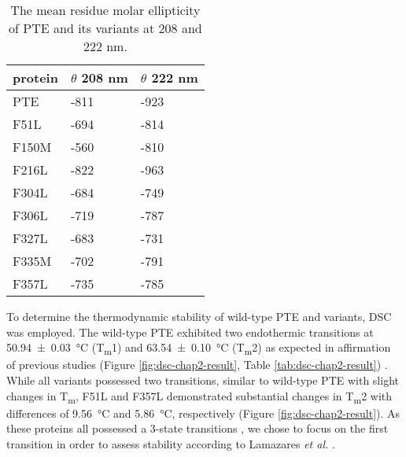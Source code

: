 \begin{refsection}
\begin{table}[htbp]
    \centering
    \begin{tabular}{lll}
    \hline

    protein & $\theta$ 208 nm & $\theta$ 222 nm\\
    \hline

    PTE & -811  & -923 \\
    F51L & -694 &  -814 \\
    F150M & -560 & -810 \\
    F216L & -822 & -963 \\
    F304L & -684 & -749 \\
    F306L & -719 & -787 \\
    F327L & -683 & -731 \\
    F335M & -702 & -791 \\
    F357L & -735 & -785 \\

    \hline      
    \end{tabular}
    \caption[The mean residue molar ellipticity of PTE and its variants at 208
    and 222 nm.] {The mean residue molar ellipticity of PTE and its variants at
        208 and 222 nm.} 
    \label{tab:cd-chap2-result}
\end{table}

To determine the thermodynamic stability of wild-type PTE and variants, DSC was
employed.  The wild-type PTE exhibited two endothermic transitions at
\SI{50.94\pm0.03}{\celsius} (T\textsubscript{m}1) and
\SI{63.54\pm0.10}{\celsius} (T\textsubscript{m}2) as expected in affirmation of
previous studies (Figure \ref{fig:dsc-chap2-result}, Table
\ref{tab:dsc-chap2-result}) \cite{Baker2011b}. While all variants possessed two
transitions, similar to wild-type PTE with slight changes in
T\textsubscript{m}, F51L and F357L demonstrated substantial changes in
T\textsubscript{m}2 with differences of \SI{9.56}{\celsius} and
\SI{5.86}{\celsius}, respectively (Figure \ref{fig:dsc-chap2-result}). As these
proteins all possessed a 3-state transitions \cite{Yang2014a}, we chose to
focus on the first transition in order to assess stability according to
Lamazares \emph{et al.} \cite{Lamazares2015}.


\end{refsection}
